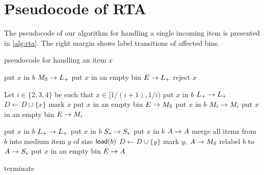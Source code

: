 

\section{Pseudocode of RTA}
\label{sec:pseudocode}

The pseudocode of our algorithm \ALG for handling a single incoming item is presented in \cref{alg:rta}.
The right margin shows label transitions of affected bins. 

\begin{algorithm}[!t]
  \caption{\ALG pseudocode for handling an item $x$}\label{alg:rta}
  \begin{algorithmic}[0]
           \State put $x$ in $b$ \Comment $M_\mathrm{S} \to L_+$
        \Else
           \State put $x$ in an empty bin \Comment $E \to L_+$
        \EndIf
     \Else
        \State reject $x$
     \EndIf
  \EndIf

  \Statex
     \State Let $i \in \{2,3,4\}$ be such that $x \in [1/(i+1),1/i)$
        \State put $x$ in $b$ \Comment $L_+ \to L_+$
        \State $D \gets D \cup \{x\}$ \Comment mark $x$
        \State put $x$ in an empty bin \Comment $E \to M_\mathrm{S}$
        \State put $x$ in $b$ \Comment $M_{i} \to M_{i}$
     \Else 
        \State put $x$ in an empty bin \Comment $E \to M_{i}$
     \EndIf
  \EndIf
 
  \Statex
        \State put $x$ in $b$ \Comment $L_+ \to L_+$
        \State put $x$ in $b$ \Comment $S_*  \to S_*$
        \State put $x$ in $b$ \Comment $A \to A$
              \State merge all items from $b$ into medium item $y$ of size $\textsf{load}(b)$ 
              \State $D \gets D \cup \{ y \}$ 
                 \Comment mark $y$, $A \to M_\mathrm{S}$  
           \Else 
              \State relabel $b$ to \ST \Comment $A \to S_*$
           \EndIf
        \EndIf
     \Else
        \State put $x$ in an empty bin \Comment $E \to A$
     \EndIf
  \EndIf
  
  \Statex
  \State terminate
  \EndIf
\end{algorithmic}
\end{algorithm}


